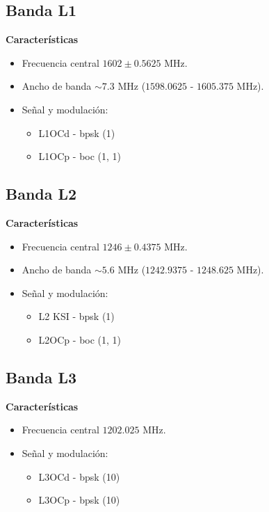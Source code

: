 \subsection{Banda L1}

\begin{justify}
    \textbf{Características}
    \begin{itemize}
        \item Frecuencia central $1602 \pm 0.5625$ MHz.
        \item Ancho de banda $\sim 7.3$ MHz ($1598.0625$ - $1605.375$ MHz).
        \item Señal y modulación:
        \begin{itemize}
            \item L1OCd - \gls{bpsk} (1)
            \item L1OCp - \gls{boc} (1, 1)
        \end{itemize}
    \end{itemize}
\end{justify}

\subsection{Banda L2}

\begin{justify}
    \textbf{Características}
    \begin{itemize}
        \item Frecuencia central $1246 \pm 0.4375$ MHz.
        \item Ancho de banda $\sim 5.6$ MHz ($1242.9375$ - $1248.625$ MHz).
        \item Señal y modulación:
        \begin{itemize}
            \item L2 KSI - \gls{bpsk} (1)
            \item L2OCp - \gls{boc} (1, 1)
        \end{itemize}
    \end{itemize}
\end{justify}

\subsection{Banda L3}

\begin{justify}
    \textbf{Características}
    \begin{itemize}
        \item Frecuencia central $1202.025$ MHz.
        \item Señal y modulación:
        \begin{itemize}
            \item L3OCd - \gls{bpsk} (10)
            \item L3OCp - \gls{bpsk} (10)
        \end{itemize}
    \end{itemize}
\end{justify}
